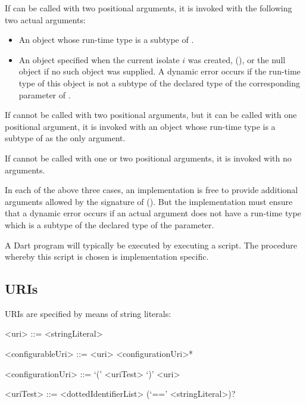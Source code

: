 \documentclass[makeidx]{article}
\begin{document}
\LMHash{}%
If  can be called with two positional arguments,
it is invoked with the following two actual arguments:

\begin{itemize}
\item
  An object whose run-time type is a subtype of .
\item
  An object specified when the current isolate $i$ was created,
  (),
  or the null object if no such object was supplied.
  A dynamic error occurs if
  the run-time type of this object is not a subtype of
  the declared type of the corresponding parameter of .
\end{itemize}

\LMHash{}%
If  cannot be called with two positional arguments,
but it can be called with one positional argument,
it is invoked with an object whose run-time type is
a subtype of 
as the only argument.

\LMHash{}%
If  cannot be called with one or two positional arguments,
it is invoked with no arguments.

\LMHash{}%
In each of the above three cases,
an implementation is free to provide additional arguments
allowed by the signature of 
().
But the implementation must ensure that a dynamic error occurs
if an actual argument does not have a run-time type which is
a subtype of the declared type of the parameter.

\LMHash{}%
A Dart program will typically be executed by executing a script.
The procedure whereby this script is chosen is implementation specific.


\subsection{URIs}

\LMHash{}%
URIs are specified by means of string literals:

\begin{grammar}
<uri> ::= <stringLiteral>

<configurableUri> ::= <uri> <configurationUri>*

<configurationUri> ::= \IF{} `(' <uriTest> `)' <uri>

<uriTest> ::= <dottedIdentifierList> (`==' <stringLiteral>)?
\end{grammar}
\end{document}
